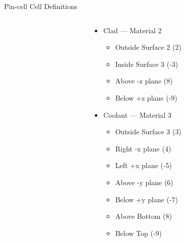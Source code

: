 \documentclass[serif]{beamer}
\begin{document}
\begin{frame}[fragile]{Pin-cell Cell Definitions}
\begin{columns}
\begin{column}{0.4\linewidth}
\begin{itemize}
      \end{itemize}
    \end{column}
    \begin{column}{0.4\linewidth}\footnotesize
      \begin{itemize}
        \item<1-> {\color{yellow!80!black} Clad} --- Material 2
        \begin{itemize}\scriptsize
           \item<1-> Outside Surface 2 (2)
           \item<1-> Inside Surface 3 (-3) 
           \item<1-> Above -z plane (8)
           \item<1-> Below +z plane (-9)
        \end{itemize}\vfill
        \item<1-> {\color{blue} Coolant} --- Material 3
        \begin{itemize}\scriptsize
           \item<1-> Outside Surface 3 (3)
           \item<1-> Right -x plane (4)
           \item<1-> Left +x plane (-5)
           \item<1-> Above -y plane (6)
           \item<1-> Below +y plane (-7)
           \item<1-> Above Bottom (8)
           \item<1-> Below Top (-9)
        \end{itemize}
      \end{itemize}
    \end{column}
  \end{columns}

\end{frame}

\end{document}
